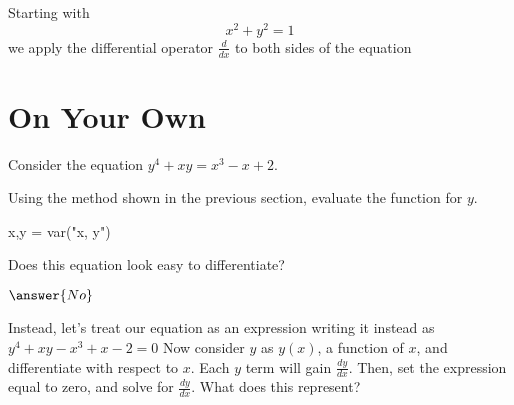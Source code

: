 \documentclass{ximera}
\begin{document}
\begin{explanation}
Starting with
$$x^2 + y^2 = 1$$
we apply the differential operator $\frac{d}{dx}$ to both sides of the equation




\end{explanation}
\setcounter{problem}{0}
\section{On Your Own}
Consider the equation $y^4+xy=x^3-x+2$.
\begin{question}
Using the method shown in the previous section, evaluate the function for $y$.
\begin{onlineOnly}
\begin{sageCell}
x,y = var("x, y")
\end{sageCell}
\end{onlineOnly}
Does this equation look easy to differentiate?

$\answer{No}$

Instead, let's treat our equation as an expression writing it instead as $y^4+xy-x^3+x-2=0$ Now consider $y$ as $y(x)$, a function of $x$, and differentiate with respect to $x$. Each $y$ term will gain $\frac{dy}{dx}$. Then, set the expression equal to zero, and solve for $\frac{dy}{dx}$. What does this represent?
\begin{freeResponse}
\end{freeResponse}
\end{question}
\end{document}
